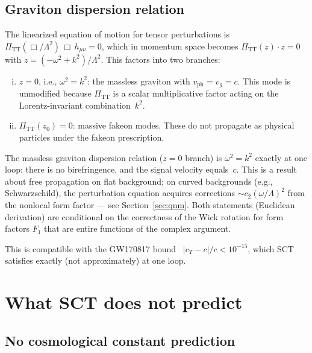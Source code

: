 \documentclass[12pt,a4paper]{article}
\theoremstyle{plain}
\theoremstyle{definition}
\theoremstyle{remark}
\begin{document}
\subsection{Graviton dispersion relation}
\label{sec:dispersion}

The linearized equation of motion for tensor perturbations is
$\Pi_{\mathrm{TT}}(\Box/\Lambda^2)\,\Box\, h_{\mu\nu} = 0$,
which in momentum space becomes
$\Pi_{\mathrm{TT}}(z)\cdot z = 0$ with
$z = (-\omega^2 + k^2)/\Lambda^2$.  This factors into two
branches:
\begin{enumerate}[(i)]
\item $z = 0$, i.e., $\omega^2 = k^2$: the massless graviton
  with $v_{\mathrm{ph}} = v_g = c$.  This mode is unmodified
  because $\Pi_{\mathrm{TT}}$ is a scalar multiplicative factor
  acting on the Lorentz-invariant combination~$k^2$.
\item $\Pi_{\mathrm{TT}}(z_0) = 0$: massive fakeon modes.
  These do not propagate as physical particles under the fakeon
  prescription.
\end{enumerate}

The massless graviton dispersion relation ($z = 0$ branch) is
$\omega^2 = k^2$ exactly at one loop: there is no
birefringence, and the signal velocity equals~$c$.  This is a
result about free propagation on flat background; on curved
backgrounds (e.g., Schwarzschild), the perturbation equation
acquires corrections $\sim c_2(\omega/\Lambda)^2$ from the
nonlocal form factor --- see Section~\ref{sec:qnm}.  Both
statements (Euclidean derivation) are conditional on the
correctness of the Wick rotation for form factors $F_1$ that
are entire functions of the complex argument.

This is compatible with the GW170817
bound~\cite{GW170817:2017}
$|c_T - c|/c < 10^{-15}$,
which SCT satisfies exactly (not approximately) at one loop.

\section{What SCT does not predict}
\label{sec:negative}

\subsection{No cosmological constant prediction}
\label{sec:cc}
\end{document}
